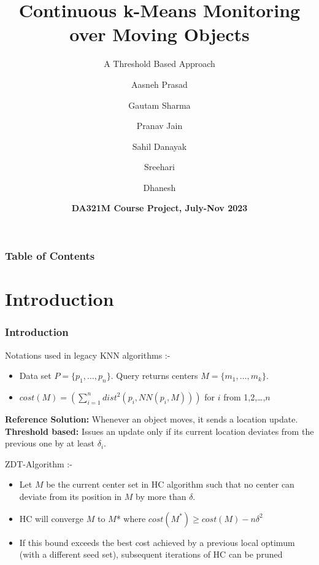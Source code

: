 \documentclass{beamer}
\title[Threshold Based \textit{K}-Means Monitoring] %
{Continuous k-Means Monitoring
over Moving Objects}
\subtitle{A Threshold Based Approach}
\author[Group 7] %
{Aasneh Prasad \and Gautam Sharma \and Pranav Jain \and Sahil Danayak \and Sreehari \and Dhanesh}
\date[16th November 2023] %
{\textbf{DA321M Course Project, July-Nov 2023}}
\begin{document}
\frame{\titlepage}


\begin{frame}
  \frametitle{Table of Contents}
  \tableofcontents
\end{frame}


\section{Introduction}
\begin{frame}
  \frametitle{Introduction}

  \vspace{-1mm}
  Notations used in legacy KNN algorithms :-
  \begin{itemize}
      \item Data set \(P=\{p_1, \ldots, p_n\}\). Query returns centers \(M=\{m_1, \ldots, m_k\}\).
      \item \(cost(M) = \left( \sum_{i=1}^{n} dist^2(p_i, NN(p_i, M)) \right)\) for \(i\) from 1,2,\ldots,\(n\)
  \end{itemize}
  \vspace{2mm}

    \textbf{Reference Solution:} Whenever an object moves, it sends a location update. \\

    \textbf{Threshold based:} Issues an update only if its current location deviates from the previous one by at least $\delta_i$.

  \vspace{2mm}

  ZDT-Algorithm :-
  \begin{itemize}
      \item Let \(M\) be the current center set in HC algorithm such that no center can deviate from its position in \(M\) by more than \(\delta\).
      \item HC will converge \(M\) to \(M\)* where \(cost(M^*) \geq cost(M)-n\delta^2 \)
      \item If this bound exceeds the best cost achieved by a previous local optimum (with a different seed set), subsequent iterations of HC can be pruned
  \end{itemize}
\end{frame}
\end{document}
